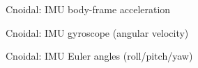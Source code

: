 \documentclass[11pt,letterpaper]{article}
\begin{document}
\begin{figure}[H]\centering
  \resizebox{\textwidth}{!}{}
  \caption{Cnoidal: IMU body-frame acceleration}
  \label{fig:cnoidal_imu_accel}
\end{figure}
\clearpage

\begin{figure}[H]\centering
  \resizebox{\textwidth}{!}{}
  \caption{Cnoidal: IMU gyroscope (angular velocity)}
  \label{fig:cnoidal_imu_gyro}
\end{figure}
\clearpage

\begin{figure}[H]\centering
  \resizebox{\textwidth}{!}{}
  \caption{Cnoidal: IMU Euler angles (roll/pitch/yaw)}
  \label{fig:cnoidal_euler}
\end{figure}
\clearpage
\end{document}
